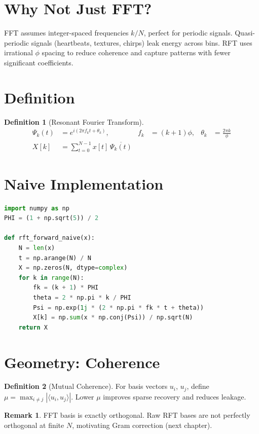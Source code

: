 \documentclass[11pt, a4paper, openany]{book}
\theoremstyle{definition}
\newtheorem{definition}{Definition}[chapter]
\newtheorem{remark}{Remark}[chapter]
\begin{document}
\section{Why Not Just FFT?}
FFT assumes integer-spaced frequencies $k/N$, perfect for periodic signals. Quasi-periodic signals (heartbeats, textures, chirps) leak energy across bins. RFT uses irrational $\phi$ spacing to reduce coherence and capture patterns with fewer significant coefficients.

\section{Definition}
\begin{definition}[Resonant Fourier Transform]
\begin{align}
    \Psi_k(t) &= e^{i(2\pi f_k t + \theta_k)}, & f_k &= (k+1)\phi, & \theta_k &= \frac{2\pi k}{\phi}\\
    X[k] &= \sum_{t=0}^{N-1} x[t] \, \overline{\Psi_k(t)}
\end{align}
\end{definition}

\section{Naive Implementation}
\begin{lstlisting}[language=Python, caption={Naive RFT ($O(N^2)$)}]
import numpy as np
PHI = (1 + np.sqrt(5)) / 2

def rft_forward_naive(x):
    N = len(x)
    t = np.arange(N) / N
    X = np.zeros(N, dtype=complex)
    for k in range(N):
        fk = (k + 1) * PHI
        theta = 2 * np.pi * k / PHI
        Psi = np.exp(1j * (2 * np.pi * fk * t + theta))
        X[k] = np.sum(x * np.conj(Psi)) / np.sqrt(N)
    return X
\end{lstlisting}

\section{Geometry: Coherence}
\begin{definition}[Mutual Coherence]
For basis vectors $u_i$, $u_j$, define $\mu = \max_{i\neq j} |\langle u_i, u_j \rangle|$. Lower $\mu$ improves sparse recovery and reduces leakage.
\end{definition}

\begin{remark}
FFT basis is exactly orthogonal. Raw RFT bases are not perfectly orthogonal at finite $N$, motivating Gram correction (next chapter).
\end{remark}
\end{document}
